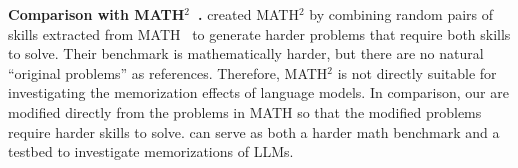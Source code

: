 \textbf{Comparison with MATH$^2$~\citep{shah2024ai}.}
\citet{shah2024ai} created MATH$^2$ by combining random pairs of skills extracted from MATH~\citep{hendrycksmath2021} to generate harder problems that require both skills to solve. Their benchmark is mathematically harder, but there are no natural ``original problems'' as references. Therefore, MATH$^2$ is not directly suitable for investigating the memorization effects of language models. In comparison, our \HARD are modified directly from the problems in MATH so that the modified problems require harder skills to solve. \HARD can serve as both a harder math benchmark and a testbed to investigate memorizations of LLMs.
